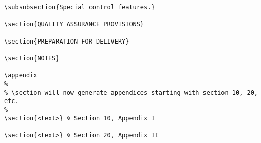 \begin{itemize}
\begin{small}
\begin{verbatim}
\subsubsection{Special control features.}

\section{QUALITY ASSURANCE PROVISIONS}

\section{PREPARATION FOR DELIVERY}

\section{NOTES}

\appendix
%
% \section will now generate appendices starting with section 10, 20, etc.
%
\section{<text>} % Section 10, Appendix I

\section{<text>} % Section 20, Appendix II


\end{verbatim}
\end{small}

\end{itemize}


